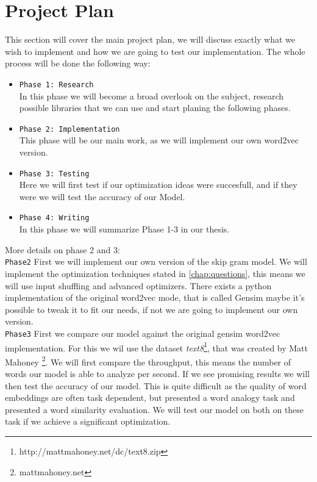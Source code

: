 \chapter{Project Plan}\label{chap:introduction}

This section will cover the main project plan, we will discuss exactly what we wish to implement and how we are going to test our implementation. 
The whole process will be done the following way: 
\begin{itemize}
\item \texttt{Phase 1: Research} \\ In this phase we will become a broad overlook on the subject, research possible libraries that we can use and start planing the following phases.
\item \texttt{Phase 2: Implementation} \\ This phase will be our main work, as we will implement our own word2vec version.
\item \texttt{Phase 3: Testing} \\ Here we will first test if our optimization ideas were succesfull, and if they were we will test the accuracy of our Model. 
\item \texttt{Phase 4: Writing} \\ In this phase we will summarize Phase 1-3 in our thesis. 
\end{itemize}
More details on phase 2 and 3:\\
\texttt{Phase2}
First we will implement our own version of the skip gram model. We will implement the optimization techniques stated in \ref{chap:questions}, this means we will use input shuffling and  advanced optimizers.  There exists a python implementation of the original word2vec mode, that is called Gensim \cite{gensim}maybe it's possible to tweak it to fit our needs, if not we are going to implement our own version. \\
\texttt{Phase3}
First we compare our model against the original gensim word2vec implementation. For this we wil use the dataset \textit{text8}\footnote{ http://mattmahoney.net/dc/text8.zip }, that was created by Matt Mahoney \footnote{mattmahoney.net}. We will first compare the throughput, this means the number of words our model is able to analyze per second. If we see promising results we will then test the accuracy of our model. This is quite difficult as the quality of word embeddings are often task dependent, but \cite{mikolov2} presented a word analogy task  and \cite{wSimilarity} presented a  word similarity evaluation. We will test our model on both on these task if we achieve a significant optimization. 

